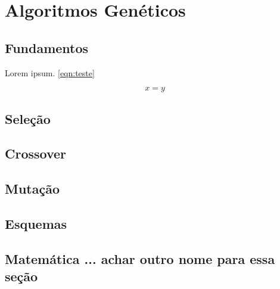 
\chapter{Algoritmos Genéticos}
\label{chap:GA}

\section{Fundamentos}

Lorem ipsum. \autoref{eqn:teste}

\begin{equation}
\label{eqn:teste}
x = y
\end{equation}


\section{Seleção}

\section{Crossover}

\section{Mutação}

\section{Esquemas}

\section{Matemática ... achar outro nome para essa seção}
